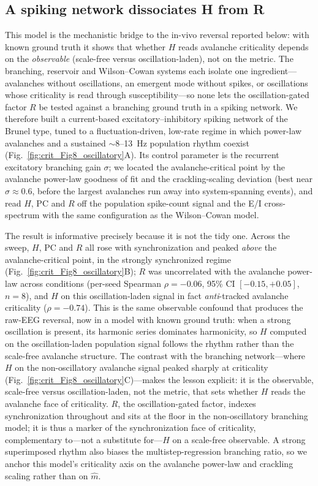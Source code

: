 \documentclass[11pt]{article}
\begin{document}
\subsection{A spiking network dissociates H from R}
This model is the mechanistic bridge to the in-vivo reversal reported below: with known ground truth it shows that whether $H$ reads avalanche criticality depends on the \emph{observable} (scale-free versus oscillation-laden), not on the metric. The branching, reservoir and Wilson--Cowan systems each isolate one ingredient---avalanches without oscillations, an emergent mode without spikes, or oscillations whose criticality is read through susceptibility---so none lets the oscillation-gated factor $R$ be tested against a branching ground truth in a spiking network. We therefore built a current-based excitatory--inhibitory spiking network of the Brunel type, tuned to a fluctuation-driven, low-rate regime in which power-law avalanches and a sustained $\sim$8--13~Hz population rhythm coexist (Fig.~\ref{fig:crit_Fig8_oscillatory}A). Its control parameter is the recurrent excitatory branching gain $\sigma$; we located the avalanche-critical point by the avalanche power-law goodness of fit and the crackling-scaling deviation (best near $\sigma\approx0.6$, before the largest avalanches run away into system-spanning events), and read $H$, $\mathrm{PC}$ and $R$ off the population spike-count signal and the E/I cross-spectrum with the same configuration as the Wilson--Cowan model.

The result is informative precisely because it is not the tidy one. Across the sweep, $H$, $\mathrm{PC}$ and $R$ all rose with synchronization and peaked \emph{above} the avalanche-critical point, in the strongly synchronized regime (Fig.~\ref{fig:crit_Fig8_oscillatory}B); $R$ was uncorrelated with the avalanche power-law across conditions (per-seed Spearman $\rho=-0.06$, 95\% CI $[-0.15,+0.05]$, $n=8$), and $H$ on this oscillation-laden signal in fact \emph{anti}-tracked avalanche criticality ($\rho=-0.74$). This is the same observable confound that produces the raw-EEG reversal, now in a model with known ground truth: when a strong oscillation is present, its harmonic series dominates harmonicity, so $H$ computed on the oscillation-laden population signal follows the rhythm rather than the scale-free avalanche structure. The contrast with the branching network---where $H$ on the non-oscillatory avalanche signal peaked sharply at criticality (Fig.~\ref{fig:crit_Fig8_oscillatory}C)---makes the lesson explicit: it is the observable, scale-free versus oscillation-laden, not the metric, that sets whether $H$ reads the avalanche face of criticality. $R$, the oscillation-gated factor, indexes synchronization throughout and sits at the floor in the non-oscillatory branching model; it is thus a marker of the synchronization face of criticality, complementary to---not a substitute for---$H$ on a scale-free observable. A strong superimposed rhythm also biases the multistep-regression branching ratio, so we anchor this model's criticality axis on the avalanche power-law and crackling scaling rather than on $\hat m$.
\end{document}
